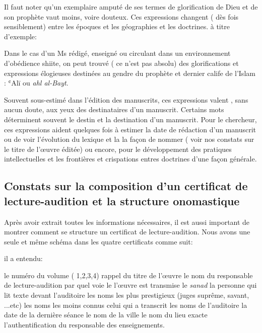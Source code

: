 \documentclass[a4paper,12pt]{report}
\begin{document}
\begin{itemize}
\begin{enumerate}
\begin{enumerate}
\begin{enumerate}
Il faut noter qu'un exemplaire amputé de ses termes   de glorification de Dieu et de son prophète vaut moins, voire douteux. Ces expressions changent ( dès fois sensiblement)  entre les époques et les géographies et les doctrines. à titre d'exemple:

Dans le cas d’un Ms rédigé, enseigné ou  circulant dans un environnement d’obédience shiite, on peut trouvé ( ce n'est pas absolu) des  glorifications et expressions élogieuses  destinées   au gendre du prophète et dernier calife de l'Islam : ʿAlī ou \textit{ahl al-Bayt}. 

Souvent sous-estimé dans l'édition des manuscrits,  ces expressions  valent , sans aucun doute, aux yeux des destinataires d'un manuscrit. Certains mots déterminent  souvent le destin et la destination d'un manuscrit. Pour le chercheur, ces expressions aident quelques fois à  estimer la date de rédaction d'un manuscrit ou de voir l'évolution du lexique et la la façon de nommer  ( voir nos constats sur le titre  de l'œuvre éditée) ou encore, pour le développement des pratiques  intellectuelles et les  frontières et crispations  entres doctrines  d'une façon  générale.   
\end{enumerate}
\end{enumerate}

    \subsection{ Constats sur la  composition  d'un certificat de lecture-audition et la structure onomastique   }

Après avoir extrait toutes les informations nécessaires, il est aussi important de montrer comment se structure un certificat de lecture-audition. Nous avons une seule et même schéma  dans les quatre  certificats comme suit:   

 il a entendu:  

 le numéro du volume ( 1,2,3,4)  rappel du titre de l'œuvre 
 le nom du responsable de lecture-audition  par quel voie le l'œuvre est transmise le \textit{sanad}  la personne qui lit texte devant l'auditoire  les noms les plus prestigieux (juges suprême, savant, ...etc) 
  les noms les moins connus  celui qui a transcrit les noms de l'auditoire   la date de la dernière séance  le nom de la  ville  le nom du lieu exacte  l'authentification du responsable des enseignements.


\end{enumerate}
\end{itemize}
\end{document}
